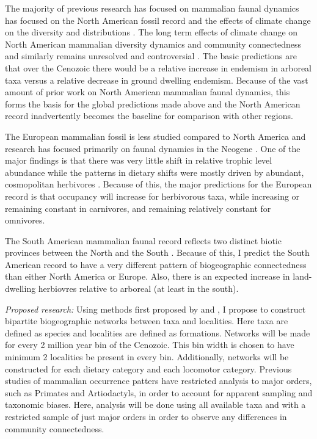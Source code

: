 \documentclass[12pt,letterpaper]{article}
\begin{document}
The majority of previous research has focused on mammalian faunal dynamics has focused on the North American fossil record and the effects of climate change on the diversity and distributions \citep{Alroy2000g,Alroy1996a,Alroy1998,Barnosky2001a,Simpson1944,Simpson1953,Badgley2013,Blois2009,Figueirido2012,Gunnell1995,Hadly2001}. The long term effects of climate change on North American mammalian diversity dynamics and community connectedness and similarly remains unresolved and controversial \citep{Alroy2000g,Blois2009,Figueirido2012,Barnosky2001a}. The basic predictions are that over the Cenozoic there would be a relative increase in endemism in arboreal taxa versus a relative decrease in ground dwelling endemism. Because of the vast amount of prior work on North American mammalian faunal dynamics, this forms the basis for the global predictions made above and the North American record inadvertently becomes the baseline for comparison with other regions.

The European mammalian fossil is less studied compared to North America and research has focused primarily on faunal dynamics in the Neogene \citep{Jernvall2002,Jernvall2004,Liow2008,Raia2006,Raia2005,Raia2011c}. One of the major findings is that there was very little shift in relative trophic level abundance \citep{Jernvall2004} while the patterns in dietary shifts were mostly driven by abundant, cosmopolitan herbivores \citep{Jernvall2002}. Because of this, the major predictions for the European record is that occupancy will increase for herbivorous taxa, while increasing or remaining constant in carnivores, and remaining relatively constant for omnivores. 

The South American mammalian faunal record reflects two distinct biotic provinces between the North and the South \citep{Macfadden1997,Macfadden2006,Flynn1998a,Patterson1968}. Because of this, I predict the South American record to have a very different pattern of biogeographic connectedness than either North America or Europe. Also, there is an expected increase in land-dwelling herbiovres relative to arboreal (at least in the south).


\textit{Proposed research:}
Using methods first proposed by \citet{Sidor2013} and \citet{Vilhena2013}, I propose to construct bipartite biogeographic networks between taxa and localities. Here taxa are defined as species and localities are defined as formations. Networks will be made for every 2 million year bin of the Cenozoic. This bin width is chosen to have minimum 2 localities be present in every bin. Additionally, networks will be constructed for each dietary category and each locomotor category. Previous studies of mammalian occurrence patters have restricted analysis to major orders, such as Primates and Artiodactyls, in order to account for apparent sampling and taxonomic biases. Here, analysis will be done using all available taxa and with a restricted sample of just major orders in order to observe any differences in community connectedness.
\end{document}
